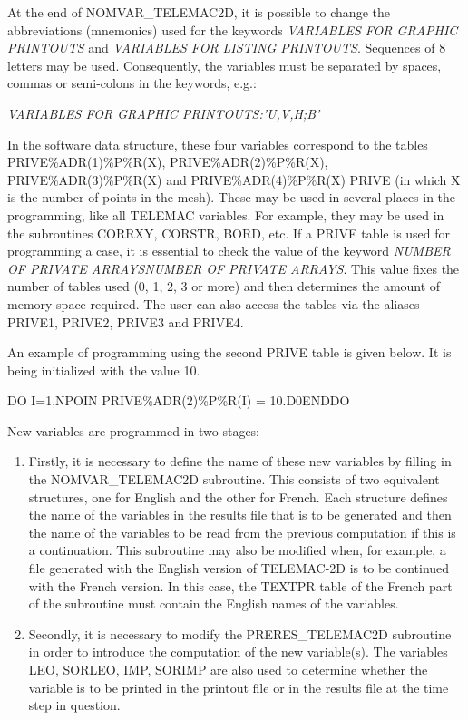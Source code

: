  At the end of NOMVAR\_TELEMAC2D, it is possible to change the abbreviations (mnemonics) used for the keywords \textit{VARIABLES FOR GRAPHIC PRINTOUTS} and \textit{VARIABLES FOR LISTING PRINTOUTS}. Sequences of 8 letters may be used. Consequently, the variables must be separated by spaces, commas or semi-colons in the keywords, e.g.:

 \textit{VARIABLES FOR GRAPHIC PRINTOUTS:'U,V,H;B'}

 In the software data structure, these four variables correspond to the tables PRIVE\%ADR(1)\%P\%R(X), PRIVE\%ADR(2)\%P\%R(X), PRIVE\%ADR(3)\%P\%R(X) and PRIVE\%ADR(4)\%P\%R(X) PRIVE (in which X is the number of points in the mesh). These may be used in several places in the programming, like all TELEMAC variables. For example, they may be used in the subroutines CORRXY, CORSTR, BORD, etc. If a PRIVE table is used for programming a case, it is essential to check the value of the keyword \textit{NUMBER OF PRIVATE ARRAYSNUMBER OF PRIVATE ARRAYS}. This value fixes the number of tables used (0, 1, 2, 3 or more) and then determines the amount of memory space required. The user can also access the tables via the aliases PRIVE1, PRIVE2, PRIVE3 and PRIVE4.

 An example of programming using the second PRIVE table is given below. It is being initialized with the value 10.

 DO I=1,NPOIN   PRIVE\%ADR(2)\%P\%R(I) = 10.D0ENDDO

 New variables are programmed in two stages:

\begin{enumerate}
\item  Firstly, it is necessary to define the name of these new variables by filling in the NOMVAR\_TELEMAC2D subroutine. This consists of two equivalent structures, one for English and the other for French. Each structure defines the name of the variables in the results file that is to be generated and then the name of the variables to be read from the previous computation if this is a continuation. This subroutine may also be modified when, for example, a file generated with the English version of TELEMAC-2D  is to be continued with the French version. In this case, the TEXTPR table of the French part of the subroutine must contain the English names of the variables.

\item  Secondly, it is necessary to modify the PRERES\_TELEMAC2D subroutine in order to introduce the computation of the new variable(s). The variables LEO, SORLEO, IMP, SORIMP are also used to determine whether the variable is to be printed in the printout file or in the results file at the time step in question.
\end{enumerate}


